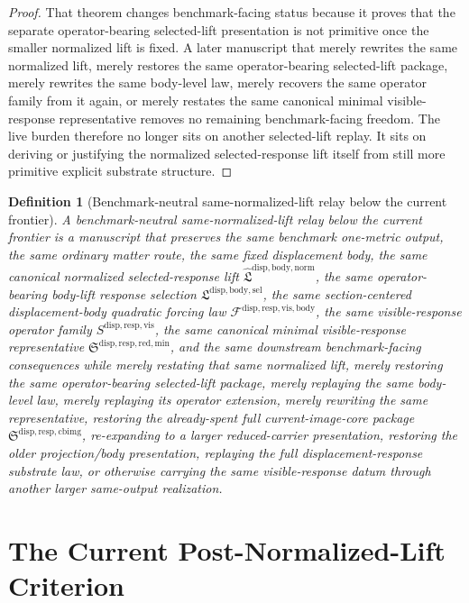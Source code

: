 \documentclass[11pt]{article}
\newcommand{\LiftSelectionPackage}{\mathfrak L^{\mathrm{disp,body,sel}}}
\newcommand{\NormalizedLiftPackage}{\widehat{\mathfrak L}^{\mathrm{disp,body,norm}}}
\newcommand{\VisibleBodyForcingLaw}{\mathscr F^{\mathrm{disp,resp,vis,body}}}
\newcommand{\VisibleResponseOperator}{S^{\mathrm{disp,resp,vis}}}
\newcommand{\MinimalReducedStructure}{\mathfrak S^{\mathrm{disp,resp,red,min}}}
\newcommand{\CurrentBodyImageCore}{\mathfrak S^{\mathrm{disp,resp,cbimg}}}
\newtheorem{definition}{Definition}
\begin{document}
\begin{proof}
That theorem changes benchmark-facing status because it proves that the separate operator-bearing selected-lift presentation is not primitive once the smaller normalized lift is fixed. A later manuscript that merely rewrites the same normalized lift, merely restores the same operator-bearing selected-lift package, merely rewrites the same body-level law, merely recovers the same operator family from it again, or merely restates the same canonical minimal visible-response representative removes no remaining benchmark-facing freedom. The live burden therefore no longer sits on another selected-lift replay. It sits on deriving or justifying the normalized selected-response lift itself from still more primitive explicit substrate structure.
\end{proof}

\begin{definition}[Benchmark-neutral same-normalized-lift relay below the current frontier]
A \emph{benchmark-neutral same-normalized-lift relay below the current frontier} is a manuscript that preserves the same benchmark one-metric output, the same ordinary matter route, the same fixed displacement body, the same canonical normalized selected-response lift \(\NormalizedLiftPackage\), the same operator-bearing body-lift response selection \(\LiftSelectionPackage\), the same section-centered displacement-body quadratic forcing law \(\VisibleBodyForcingLaw\), the same visible-response operator family \(\VisibleResponseOperator\), the same canonical minimal visible-response representative \(\MinimalReducedStructure\), and the same downstream benchmark-facing consequences while merely restating that same normalized lift, merely restoring the same operator-bearing selected-lift package, merely replaying the same body-level law, merely replaying its operator extension, merely rewriting the same representative, restoring the already-spent full current-image-core package \(\CurrentBodyImageCore\), re-expanding to a larger reduced-carrier presentation, restoring the older projection/body presentation, replaying the full displacement-response substrate law, or otherwise carrying the same visible-response datum through another larger same-output realization.
\end{definition}

\section{The Current Post-Normalized-Lift Criterion}
\end{document}
